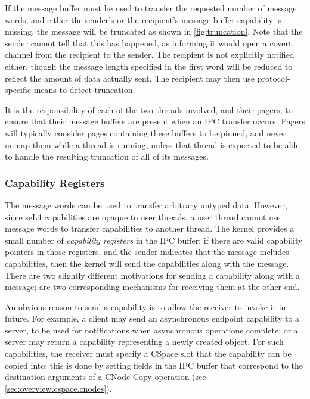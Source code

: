 If the message buffer must be used to transfer the requested number of message
words, and either the
sender's or the recipient's message buffer capability is missing, the message
will be truncated as shown in \autoref{fig:truncation}. Note that the
sender cannot tell that this has happened, as informing it would open a covert
channel from the recipient to the sender. The recipient is not explicitly
notified either, though the message length specified in the first word will be
reduced to reflect the amount of data actually sent. The recipient may then use
protocol-specific means to detect truncation.

It is the responsibility of each of the two
threads involved, and their pagers, to ensure that their message buffers are
present when an IPC transfer occurs. Pagers will typically consider pages
containing these buffers to be pinned, and never unmap them while a thread is
running, unless that thread is expected to be able to handle the resulting 
truncation of all of its messages.

\subsubsection{Capability Registers}

The message words can be used to transfer arbitrary untyped data. However, since seL4 capabilities are opaque to user threads, a user thread cannot use message words to transfer capabilities to another thread. The kernel provides a small number of \emph{capability registers} in the IPC buffer; if there are valid capability pointers in those registers, and the sender indicates that the message includes capabilities, then the kernel will send the capabilities along with the message. There are two slightly different motivations for sending a capability along with a message; are two corresponding mechanisms for receiving them at the other end. 

An obvious reason to send a capability is to allow the receiver to invoke it in future. For example, a client may send an asynchronous endpoint capability to a server, to be used for notifications when asynchronous operations complete; or a server may return a capability representing a newly created object. For such capabilities, the receiver must specify a CSpace slot that the capability can be copied into; this is done by setting fields in the IPC buffer that correspond to the destination arguments of a CNode Copy operation (see \autoref{sec:overview.cspace.cnodes}).

